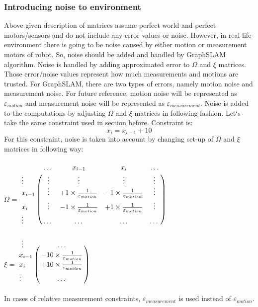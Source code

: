 \documentclass{ba-kecs}
\numberwithin{figure}{section}
\numberwithin{equation}{section}
\begin{document}
\subsubsection{Introducing noise to environment}
Above given description of matrices assume perfect world and perfect motors/sensors and do not include any error values or noise. However, in real-life environment there is going to be noise caused by either motion or measurement motors of robot. So, noise should be added and handled by GraphSLAM algorithm. Noise is handled by adding approximated error to $\Omega$ and $\xi$ matrices. Those error/noise values represent how much measurements and motions are trusted. For GraphSLAM, there are two types of errors, namely motion noise and measurement noise. For future reference, motion noise will be represented as $\varepsilon_{motion}$ and measurement noise will be represented as $\varepsilon_{measurement}$. Noise is added to the computations by adjusting $\Omega$ and $\xi$ matrices in following fashion. Let`s take the same constraint used in section before. Constraint is:
\[ x_{i} = x_{i-1} + 10 \]
For this constraint, noise is taken into account by changing set-up of $\Omega$ and $\xi$ matrices in following way:\\ \\

$\Omega$ = $\bordermatrix{~ & \dots & x_{i-1} & x_{i} & \dots \cr
							\vdots & \vdots & \vdots & \vdots & \vdots \cr
                  			x_{i-1} & \vdots & +1 \times \frac{1}{\varepsilon_{motion}} & -1 \times \frac{1}{\varepsilon_{motion}} & \vdots \cr
                  			x_{i} & \vdots & -1 \times \frac{1}{\varepsilon_{motion}} & +1 \times \frac{1}{\varepsilon_{motion}} & \vdots \cr
                  			\vdots & \dots & \dots & \dots & \dots \cr}$ \\ \\
                  			
    $\xi$ = $\bordermatrix{~ \vdots & \dots \cr
                  			x_{i-1} & -10 \times \frac{1}{\varepsilon_{motion}} \cr
                  			x_{i}  & +10 \times \frac{1}{\varepsilon_{motion}} \cr
                  			\vdots & \dots \cr}$\\ \\
                  			
In cases of relative measurement constraints, $\varepsilon_{measurement}$ is used instead of $\varepsilon_{motion}$.
	
\end{document}
